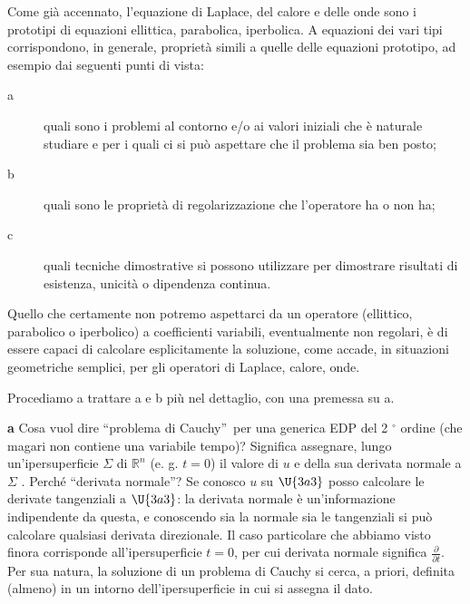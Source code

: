 \documentclass{article}
\begin{document}
Come gi\`{a} accennato, l'equazione di Laplace, del calore e delle onde sono
i prototipi di equazioni ellittica, parabolica, iperbolica. A equazioni dei
vari tipi corrispondono, in generale, propriet\`{a} simili a quelle delle
equazioni prototipo, ad esempio dai seguenti punti di vista:

\begin{description}
\item[a] quali sono i problemi al contorno e/o ai valori iniziali che \`{e}
naturale studiare e per i quali ci si pu\`{o} aspettare che il problema sia
ben posto;

\item[b] quali sono le propriet\`{a} di regolarizzazione che l'operatore ha
o non ha;

\item[c] quali tecniche dimostrative si possono utilizzare per dimostrare
risultati di esistenza, unicit\`{a} o dipendenza continua.
\end{description}

Quello che certamente non potremo aspettarci da un operatore (ellittico,
parabolico o iperbolico) a coefficienti variabili, eventualmente non
regolari, \`{e} di essere capaci di calcolare esplicitamente la soluzione,
come accade, in situazioni geometriche semplici, per gli operatori di
Laplace, calore, onde.

Procediamo a trattare a e b pi\`{u} nel dettaglio, con una premessa su a.

\textbf{a} Cosa vuol dire \textquotedblleft problema di
Cauchy\textquotedblright\ per una generica EDP del 2%
${{}^\circ}$
ordine (che magari non contiene una variabile tempo)? Significa assegnare,
lungo un'ipersuperficie $\Sigma $ di $%
\mathbb{R}
^{n}$ (e. g. $t=0$) il valore di $u$ e della sua derivata normale a $\Sigma $%
. Perch\'{e} \textquotedblleft derivata normale\textquotedblright ? Se
conosco $u$ su $\U{3a3} $ posso calcolare le derivate tangenziali a $\U{3a3} 
$: la derivata normale \`{e} un'informazione indipendente da questa, e
conoscendo sia la normale sia le tangenziali si pu\`{o} calcolare qualsiasi
derivata direzionale. Il caso particolare che abbiamo visto finora
corrisponde all'ipersuperficie $t=0$, per cui derivata normale significa $%
\frac{\partial }{\partial t}$. Per sua natura, la soluzione di un problema
di Cauchy si cerca, a priori, definita (almeno) in un intorno
dell'ipersuperficie in cui si assegna il dato.
\end{document}

